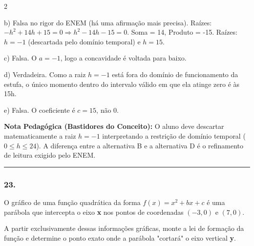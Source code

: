 \begin{multicols*}{2}
\begin{tcolorbox}[colback=CorTitUm!5, colframe=CorTitUm, boxrule=1pt, arc=4pt, left=6pt, right=6pt, top=6pt, bottom=6pt]
    b) Falsa no rigor do ENEM (há uma afirmação mais precisa). Raízes: $-h^2 + 14h + 15 = 0 \Rightarrow h^2 - 14h - 15 = 0$. Soma = 14, Produto = -15. Raízes: $h = -1$ (descartada pelo domínio temporal) e $h = 15$.
    
    c) Falsa. O $a=-1$, logo a concavidade é voltada para baixo.
    
    d) Verdadeira. Como a raiz $h = -1$ está fora do domínio de funcionamento da estufa, o único momento dentro do intervalo válido em que ela atinge zero é às 15h.
    
    e) Falsa. O coeficiente é $c = 15$, não 0.
    \end{tcolorbox}
    \vspace{0.15cm}
    
    \begin{boxexplicacao}
    \textbf{Nota Pedagógica (Bastidores do Conceito):} O aluno deve descartar matematicamente a raiz $h = -1$ interpretando a restrição de domínio temporal ($0 \le h \le 24$). A diferença entre a alternativa B e a alternativa D é o refinamento de leitura exigido pelo ENEM.
    \end{boxexplicacao}
\fi

\par\vspace{\espacoQuestao}

\noindent\textcolor{CorLinha}{\rule{\linewidth}{0.5pt}} 
\par\vspace{\espacoPreQuestao}
\subsubsection*{23.} 
\begin{enunciadoLiteral}
O gráfico de uma função quadrática da forma $f(x) = x^2 + bx + c$ é uma parábola que intercepta o eixo \textbf{x} nos pontos de coordenadas $(-3, 0)$ e $(7, 0)$.

A partir exclusivamente dessas informações gráficas, monte a lei de formação da função e determine o ponto exato onde a parábola "cortará" o eixo vertical \textbf{y}.
\end{enunciadoLiteral}


\end{multicols*}
